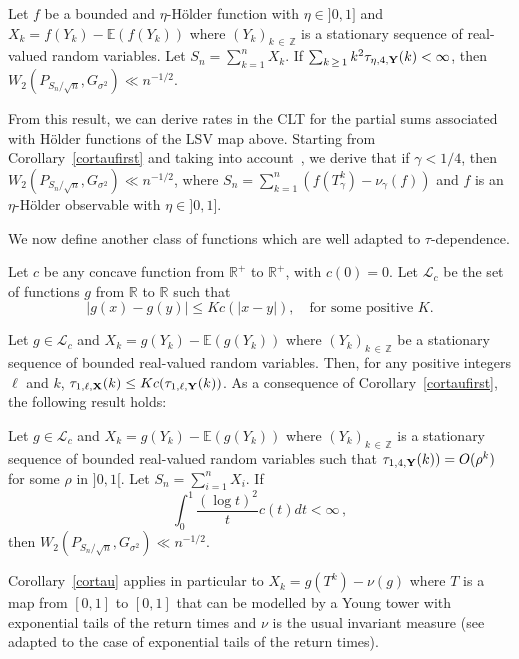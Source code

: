 \documentclass[AHL,Unicode,longabstracts,published]{cedram}
\newcommand{\bbE}{\mathbb{E}}
\newcommand{\bbZ}{\mathbb{Z}}
\newcommand{\clL}{\mathcal{L}}
\newcommand{\bbR}{\mathbb{R}}
\begin{document}
\begin{coro}\label{cortaufirst}
Let $f$ be a bounded and $\eta$-H\"older function with $\eta \in]0,1]$ and $X_k= f(Y_k) - \bbE (f(Y_k))$ where $(Y_k)_{k\,\in\,\bbZ}$ is a stationary sequence of real-valued random variables. Let $S_n = \sum_{k=1}^n X_k$. If $\sum_{k\,\geq\,1} k^2 \tau_{\eta, 4,{\bf Y}} (k) < \infty$, then $ W_2 (P_{S_n / {\sqrt n} }, G_{\sigma^2}) \ll n^{-1/2}$.
\end{coro}

From this result, we can derive rates in the CLT for the partial sums associated with H\"older functions of the LSV map above. Starting from Corollary~\ref{cortaufirst} and taking into account~\cite[Prop.~5.3 and Inequality~(4.2)]{DM15}, we derive that if $ \gamma <1/4$, then $ W_2 (P_{S_n / {\sqrt n} }, G_{\sigma^2}) \ll n^{-1/2}$, where $S_n = \sum_{k=1}^n (f(T^k_{\gamma}) -\nu_\gamma (f)) $ and $f$ is an $\eta$-H\"older observable with $\eta \in]0,1]$.


We now define another class of functions which are well adapted to $\tau$-dependence.



\begin{defi}
Let $c$ be any concave function from $\bbR^+$ to $\bbR^+$, with $c(0)=0$. Let $\clL_c$ be the set of functions $g$ from $\bbR$ to $\bbR$ such that
\[
|g(x)-g(y)| \leq K c(|x-y|), \quad \text{for some positive $K$.}
\]
\end{defi}


Let $g \in \clL_c$ and $X_k= g(Y_k) - \bbE (g(Y_k))$ where $(Y_k)_{k\,\in\,\bbZ}$ be a stationary sequence of bounded real-valued random variables. Then, for any positive integers $\ell$ and $k$, $\tau_{1,\ell,{\bf X}} (k) \leq K c (\tau_{1,\ell,{\bf Y}} (k)) $. As a consequence of Corollary~\ref{cortaufirst}, the following result holds:



\begin{coro}\label{cortau}
Let $g \in \clL_c$ and $X_k= g(Y_k) - \bbE (g(Y_k))$ where $(Y_k)_{k\,\in\,\bbZ}$ is a stationary sequence of bounded real-valued random variables such that $ \tau_{1,4,{\bf Y}} (k)) = O (\rho^k)$ for some $\rho$ in $]0,1[$. Let $S_n = \sum_{i=1}^n X_i$. If
\[
\int_0^1 \frac{ (\log t)^2}{t} c(t) dt < \infty \,,
\]
then $W_2 (P_{S_n / {\sqrt n} }, G_{\sigma^2}) \ll n^{-1/2}$.
\end{coro}

Corollary~\ref{cortau} applies in particular to $X_k= g (T^k) - \nu(g) $ where $T$ is a map from $[0,1]$ to $[0,1]$ that can be modelled by a Young tower with exponential tails of the return times and $\nu$ is the usual invariant measure (see~\cite[Section~4]{DM15} adapted to the case of exponential tails of the return times).
\end{document}
